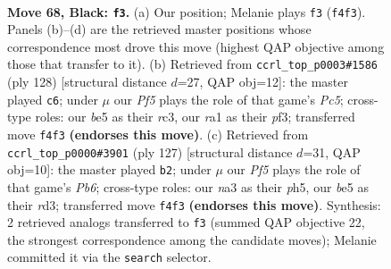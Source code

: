 \documentclass[11pt]{article}
\begin{document}
\clearpage

\begin{figure}[p]\centering
\begin{subfigure}{0.46\textwidth}\centering
\resizebox{\linewidth}{!}{%
\newchessgame
\chessboard[
  setfen={2k5/8/8/p2QB3/P4p2/N7/8/R5K1 b - - 1 68},
  showmover=false,
  pgfstyle=straightmove, color=movearrow, markmove={f4-f3}
]}
\caption{}
\end{subfigure}\hfill
\begin{subfigure}{0.46\textwidth}\centering
\resizebox{\linewidth}{!}{%
\newchessgame
\chessboard[
  setfen={7k/8/R7/2P1bN1P/8/2r2p2/5K2/8 w - - 3 65},
  showmover=false,
  pgfstyle=straightmove, color=movearrow, markmove={c5-c6}
]}
\caption{}
\end{subfigure}
\\[4pt]
\begin{subfigure}{0.46\textwidth}\centering
\resizebox{\linewidth}{!}{%
\newchessgame
\chessboard[
  setfen={8/1k6/8/6pP/6P1/1p1RK3/2r5/8 b - - 1 64},
  showmover=false,
  pgfstyle=straightmove, color=movearrow, markmove={b3-b2}
]}
\caption{}
\end{subfigure}\hfill

\caption{\textbf{Move 68, Black: \texttt{f3}.} (a) Our position; Melanie plays \texttt{f3} (\texttt{f4f3}). Panels (b)--(d) are the retrieved master positions whose correspondence most drove this move (highest QAP objective among those that transfer to it). (b) Retrieved from \texttt{ccrl\_top\_p0003\#1586} (ply 128) [structural distance $d$=27, QAP obj=12]: the master played \texttt{c6}; under $\mu$ our \emph{Pf5} plays the role of that game's \emph{Pc5}; cross-type roles: our \emph{b}e5 as their \emph{r}c3, our \emph{r}a1 as their \emph{p}f3; transferred move \texttt{f4f3} \textbf{(endorses this move)}. (c) Retrieved from \texttt{ccrl\_top\_p0000\#3901} (ply 127) [structural distance $d$=31, QAP obj=10]: the master played \texttt{b2}; under $\mu$ our \emph{Pf5} plays the role of that game's \emph{Pb6}; cross-type roles: our \emph{n}a3 as their \emph{p}h5, our \emph{b}e5 as their \emph{r}d3; transferred move \texttt{f4f3} \textbf{(endorses this move)}. Synthesis: 2 retrieved analogs transferred to \texttt{f3} (summed QAP objective 22, the strongest correspondence among the candidate moves); Melanie committed it via the \texttt{search} selector.}
\label{fig:thought-m135}
\end{figure}
\end{document}
